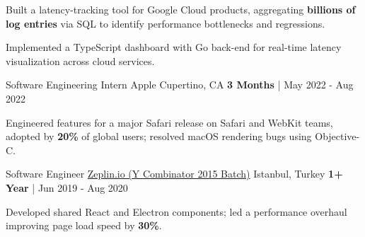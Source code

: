 \begin{cventries}
{    \begin{cvitems}
      \item {Built a latency-tracking tool for Google Cloud products, aggregating \textbf{billions of log entries} via SQL to identify performance bottlenecks and regressions.}
      \item {Implemented a TypeScript dashboard with Go back-end for real-time latency visualization across cloud services.}
    \end{cvitems}
    }
  \cvexpentry
   {Software Engineering Intern}
    {Apple}
    {Cupertino, CA}
    {\textbf{3 Months} | May 2022 - Aug 2022}
    {
    \begin{cvitems}
      \item {Engineered features for a major Safari release on Safari and WebKit teams, adopted by \textbf{20\%} of global users; resolved macOS rendering bugs using Objective-C.}
    \end{cvitems}
    }
  \cvexpentry
   {Software Engineer}
    {\href{https://zeplin.io}{Zeplin.io (Y Combinator 2015 Batch)}}
    {Istanbul, Turkey}
    {\textbf{1+ Year} | Jun 2019 - Aug 2020}
    {
    \begin{cvitems}
      \item {Developed shared React and Electron components; led a performance overhaul improving page load speed by \textbf{30\%}.}
    \end{cvitems}
    }
\end{cventries}
